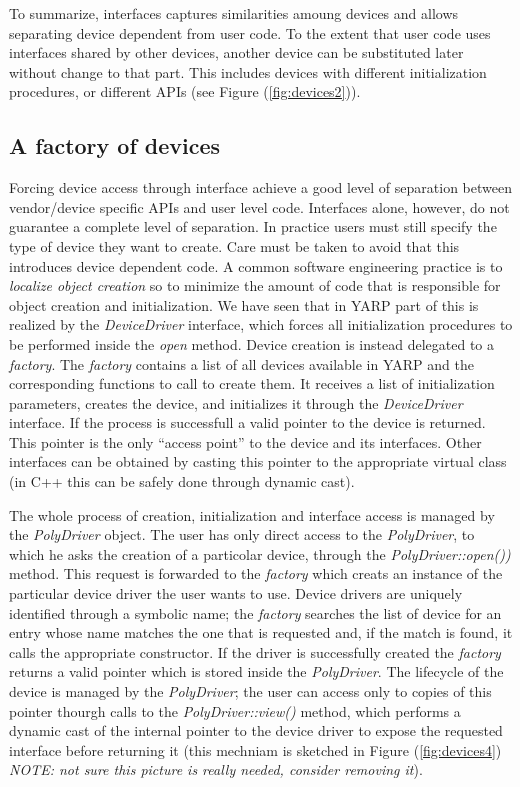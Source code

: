 To summarize, interfaces captures similarities amoung devices and 
allows separating device dependent from user code. To the 
extent that user code uses interfaces shared by other devices, 
another device can be substituted later without change to that part. This 
includes devices with different initialization procedures, or different
APIs (see Figure (\ref{fig:devices2})).

\subsection{A factory of devices}
Forcing device access through 
interface achieve a good level of separation between vendor/device 
specific APIs and user level code. Interfaces alone, however, do not 
guarantee a complete level of separation. In practice users must still 
specify the type of device they want to create. Care must be taken to 
avoid that this introduces device dependent code. A common software 
engineering practice is to \emph{localize object creation} so to 
minimize the amount of code that is responsible for object creation 
and initialization. 
We have seen that in YARP part of this is realized by the 
\emph{DeviceDriver} interface, which forces all initialization procedures 
to be performed inside the \emph{open} method. Device creation is instead 
delegated to a \emph{factory}. The \emph{factory} contains a list of 
all devices available in YARP and the corresponding functions to call 
to create them. It receives a list of initialization parameters, 
creates the device, and initializes it 
through the \emph{DeviceDriver} interface. If the process is successfull 
a valid pointer to the device is returned. This pointer is the only 
``access point'' to the device and its interfaces. Other interfaces can 
be obtained by casting this pointer to the appropriate virtual class 
(in C++ this can be safely done through dynamic cast). 

The whole process of creation, initialization and interface access is 
managed by the \emph{PolyDriver} object. The user has only direct access 
to the \emph{PolyDriver}, to which he asks the creation of a particolar 
device, through the \emph{PolyDriver::open())} method. This request is 
forwarded to the \emph{factory} which creats an instance of the particular 
device driver the user wants to use. Device drivers are uniquely identified 
through a symbolic name; the \emph{factory} searches the list of device 
for an entry whose name matches the one that is requested and, if the match 
is found, it calls the appropriate constructor. If the driver is successfully 
created the \emph{factory} returns a valid pointer which is stored inside 
the \emph{PolyDriver}. The lifecycle of the device is managed by the 
\emph{PolyDriver}; the user can access only to copies of this pointer 
thourgh calls to the \emph{PolyDriver::view()} method, which performs 
a dynamic cast of the internal pointer to the device driver to expose 
the requested interface before returning it (this mechniam is sketched 
in Figure (\ref{fig:devices4}) \emph{NOTE: not sure this picture is 
really needed, consider removing it}).

